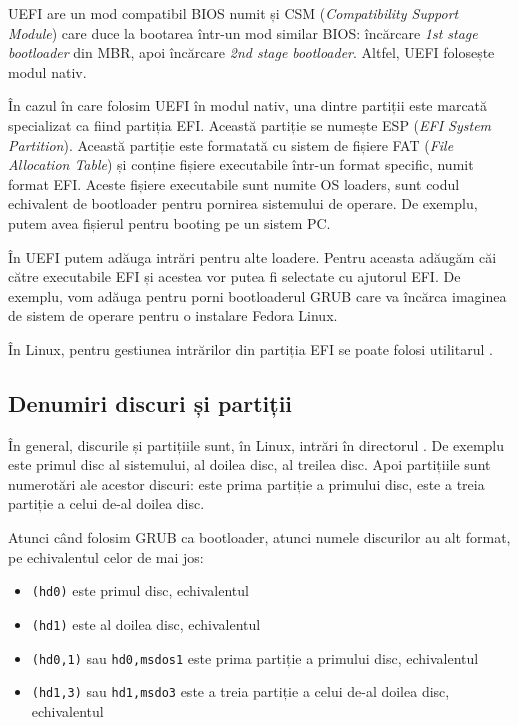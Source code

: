 UEFI are un mod compatibil BIOS numit și CSM  (\textit{Compatibility Support Module}) care duce la bootarea într-un mod similar BIOS:
încărcare \textit{1st stage bootloader} din MBR, apoi încărcare \textit{2nd stage bootloader}.
Altfel, UEFI folosește modul nativ.

În cazul în care folosim UEFI în modul nativ, una dintre partiții este marcată
specializat ca fiind partiția EFI. Această partiție se numește ESP
 (\textit{EFI System Partition}). Această partiție este
formatată cu sistem de fișiere FAT (\textit{File Allocation Table}) și conține fișiere
executabile într-un format specific, numit format EFI. Aceste fișiere
executabile sunt numite OS loaders, sunt codul echivalent de bootloader pentru
pornirea sistemului de operare. De exemplu, putem avea fișierul
 pentru booting pe un sistem PC.

În UEFI putem adăuga intrări pentru alte loadere. Pentru aceasta adăugăm căi
către executabile EFI și acestea vor putea fi selectate cu ajutorul EFI. De exemplu,
vom adăuga  pentru porni bootloaderul GRUB care va încărca
imaginea de sistem de operare pentru o instalare Fedora Linux.

În Linux, pentru gestiunea intrărilor din partiția EFI se poate folosi utilitarul
.

\subsection{Denumiri discuri și partiții}
\label{sec:boot:bootdev:naming}

În general, discurile și partițiile sunt, în Linux, intrări în directorul .
De exemplu  este primul disc al sistemului,  al doilea disc,
 al treilea disc. Apoi partițiile sunt numerotări ale acestor discuri:
 este prima partiție a primului disc,  este a treia partiție a
celui de-al doilea disc.

Atunci când folosim GRUB ca bootloader, atunci numele discurilor au alt format,
pe echivalentul celor de mai jos:

\begin{itemize}
  \item \texttt{(hd0)} este primul disc, echivalentul 
  \item \texttt{(hd1)} este al doilea disc, echivalentul 
  \item \texttt{(hd0,1)} sau \texttt{hd0,msdos1} este prima partiție a primului disc,
    echivalentul 
  \item \texttt{(hd1,3)} sau \texttt{hd1,msdo3} este a treia partiție a celui de-al doilea
    disc, echivalentul 
\end{itemize}

